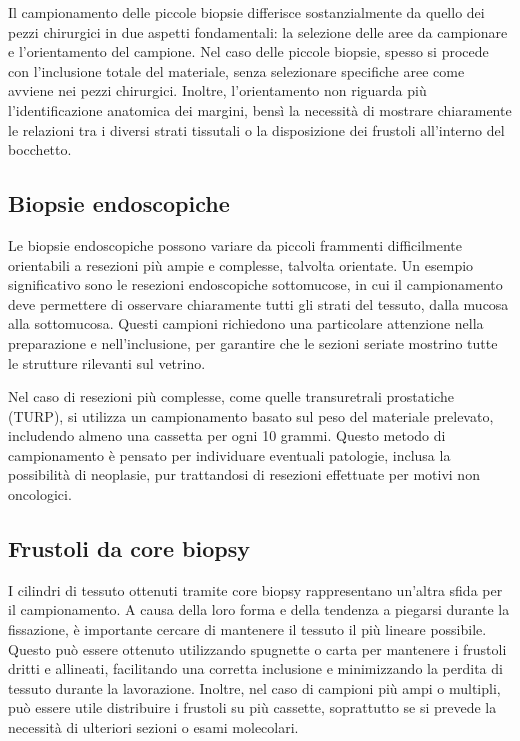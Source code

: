 Il campionamento delle piccole biopsie differisce sostanzialmente da quello dei pezzi chirurgici in due aspetti fondamentali: la selezione delle aree da campionare e l'orientamento del campione. Nel caso delle piccole biopsie, spesso si procede con l'inclusione totale del materiale, senza selezionare specifiche aree come avviene nei pezzi chirurgici. Inoltre, l'orientamento non riguarda più l'identificazione anatomica dei margini, bensì la necessità di mostrare chiaramente le relazioni tra i diversi strati tissutali o la disposizione dei frustoli all'interno del bocchetto.

\subsection{Biopsie endoscopiche}

Le biopsie endoscopiche possono variare da piccoli frammenti difficilmente orientabili a resezioni più ampie e complesse, talvolta orientate. Un esempio significativo sono le resezioni endoscopiche sottomucose, in cui il campionamento deve permettere di osservare chiaramente tutti gli strati del tessuto, dalla mucosa alla sottomucosa. Questi campioni richiedono una particolare attenzione nella preparazione e nell'inclusione, per garantire che le sezioni seriate mostrino tutte le strutture rilevanti sul vetrino.

Nel caso di resezioni più complesse, come quelle transuretrali prostatiche (TURP), si utilizza un campionamento basato sul peso del materiale prelevato, includendo almeno una cassetta per ogni 10 grammi. Questo metodo di campionamento è pensato per individuare eventuali patologie, inclusa la possibilità di neoplasie, pur trattandosi di resezioni effettuate per motivi non oncologici.

\subsection{Frustoli da core biopsy}

I cilindri di tessuto ottenuti tramite core biopsy rappresentano un'altra sfida per il campionamento. A causa della loro forma e della tendenza a piegarsi durante la fissazione, è importante cercare di mantenere il tessuto il più lineare possibile. Questo può essere ottenuto utilizzando spugnette o carta per mantenere i frustoli dritti e allineati, facilitando una corretta inclusione e minimizzando la perdita di tessuto durante la lavorazione. Inoltre, nel caso di campioni più ampi o multipli, può essere utile distribuire i frustoli su più cassette, soprattutto se si prevede la necessità di ulteriori sezioni o esami molecolari.

